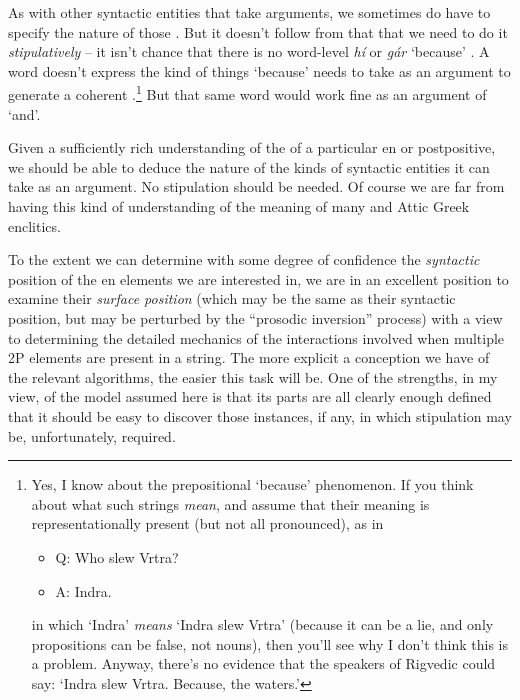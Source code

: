 \documentclass[output=paper,
modfonts
]{LSP/langsci}
\begin{document}
As with other syntactic entities that take arguments, we sometimes do have to specify the nature of those .
But it doesn't follow from that that we need to do it \textit{stipulatively} -- it isn't chance that there is no
word-level \textit{hí} or \textit{gár} `because' . A word doesn't express the kind of things `because' needs to take
as an argument to generate a coherent .\footnote{Yes, I know about the prepositional `because' phenomenon. If you think about what such strings \textit{mean},
and assume that their meaning is representationally present (but not all pronounced), as in 

\begin{itemize}
\item[] Q: Who slew Vrtra?
\item[] A: Indra.
\end{itemize}

\noindent in which `Indra' \textit{means} `Indra slew Vrtra' (because it can be a lie, and only propositions can be false, not
nouns), then you'll see why I don't think this is a problem. Anyway, there's no evidence that the speakers of Rigvedic 
could say: `Indra slew Vrtra. Because, the waters.'} But that same word would work fine as an argument of `and'. 

Given a sufficiently rich understanding of the  of a particular en or postpositive, we should be
able to deduce the nature of the kinds of syntactic entities it can take as an argument. No stipulation should
be needed. Of course we are far from having this kind of understanding of the meaning of many  and Attic Greek enclitics.

To the extent we can determine with some degree of confidence the \textit{syntactic} position of the en
elements we are interested in, we are in an excellent position to examine their \textit{surface position} (which may be
the same as their syntactic position, but may be perturbed by the ``prosodic inversion'' process) with a view to determining
the detailed mechanics of the interactions involved when multiple 2P elements are present in a string.
The more explicit a conception we have of the relevant algorithms, the easier this task will be. One of the
strengths, in my view, of the model assumed here is that its parts are all clearly enough defined that it should be
easy to discover those instances, if any, in which stipulation may be, unfortunately, required.
\end{document}
